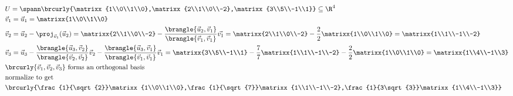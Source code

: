 \begin{align*}
    &U=\spann\brcurly{\matrixx{1\\0\\1\\0},\matrixx{2\\1\\0\\-2},\matrixx{3\\5\\-1\\1}}\subseteq\R^4\\
    &\vec{v}_1=\vec{u}_1=\matrixx{1\\0\\1\\0}\\
    &\vec{v}_2=\vec{u}_2-\proj_{\vec{v}_1}(\vec{u}_2)=\matrixx{2\\1\\0\\-2}-\frac{\brangle{\vec{u}_2,\vec{v}_1}}{\brangle{\vec{v}_1,\vec{v}_1}}\vec{v_1}=\matrixx{2\\1\\0\\-2}-\frac{2}{2}\matrixx{1\\0\\1\\0}=\matrixx{1\\1\\-1\\-2}\\
    &\vec{v}_3=\vec{u}_3-\frac{\brangle{\vec{u}_3,\vec{v}_2}}{\brangle{\vec{v}_2,\vec{v}_2}}\vec{v}_2-\frac{\brangle{\vec{u}_3,\vec{v}_1}}{\brangle{\vec{v}_1,\vec{v}_1}}\vec{v}_1=\matrixx{3\\5\\-1\\1}-\frac{7}{7}\matrixx{1\\1\\-1\\-2}-\frac{2}{2}\matrixx{1\\0\\1\\0}=\matrixx{1\\4\\-1\\3}\\
    &\brcurly{\vec{v}_1,\vec{v}_2,\vec{v}_3}\text{ forms an orthogonal basis}\\
    &\text{normalize to get}\\
    &\brcurly{\frac{1}{\sqrt{2}}\matrixx{1\\0\\1\\0},\frac{1}{\sqrt{7}}\matrixx{1\\1\\-1\\-2},\frac{1}{3\sqrt{3}}\matrixx{1\\4\\-1\\3}}
\end{align*}
